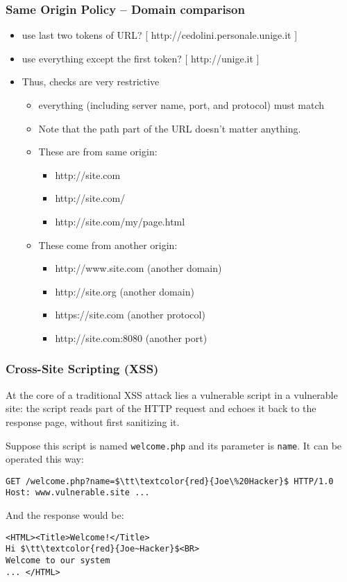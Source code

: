 \documentclass{beamer}
\begin{document}
\begin{frame}
  \frametitle{Same Origin Policy  -- Domain comparison}

  \begin{itemize}
    \item use last two tokens of URL? [ http://cedolini.personale.unige.it ]
    \item use everything except the first token? [ http://unige.it ]
  \item Thus, checks are very restrictive
    \begin{itemize}
    \item everything (including server name, port, and protocol) must match
    \item Note that the path part of the URL doesn't matter anything.
    \item These are from same origin:
      \begin{itemize}
      \item http://site.com
      \item http://site.com/
      \item http://site.com/my/page.html
      \end{itemize}
    \item These come from another origin:
      \begin{itemize}
        \item http://www.site.com (another domain)
        \item http://site.org (another domain)
        \item https://site.com (another protocol)
        \item http://site.com:8080 (another port)
        \end{itemize}
      \end{itemize}
    \end{itemize}
  \end{frame}


\begin{frame}[fragile]
  \frametitle{Cross-Site Scripting (XSS)}

  At the core of a traditional XSS attack lies a vulnerable script in
  a vulnerable site: the script reads part of the HTTP request and
  echoes it back to the response page, without first sanitizing it.

\vspace{1ex}
  Suppose this script is named \texttt{welcome.php} and its parameter
  is \texttt{name}.  It can be operated this way:
\begin{lstlisting}[style=htmlCode]
GET /welcome.php?name=$\tt\textcolor{red}{Joe\%20Hacker}$ HTTP/1.0
Host: www.vulnerable.site ... 
\end{lstlisting}
And the response would be: 
\begin{lstlisting}[style=htmlCode]
<HTML><Title>Welcome!</Title>
Hi $\tt\textcolor{red}{Joe~Hacker}$<BR>
Welcome to our system
... </HTML>
\end{lstlisting}
\end{frame}
\end{document}
